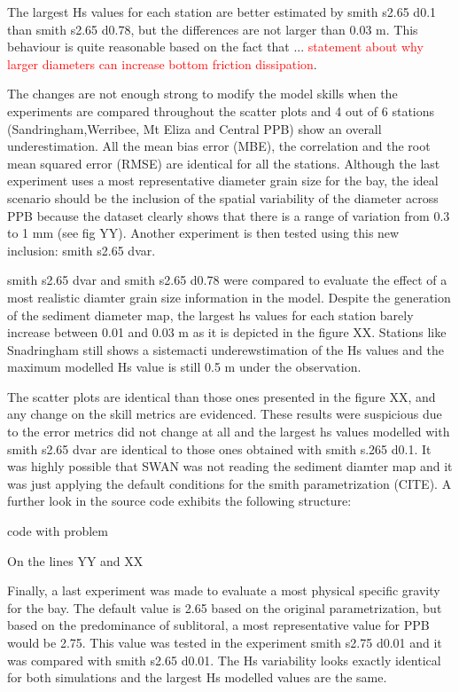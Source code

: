 \documentclass[12pt]{article}
\begin{document}
The largest Hs values for each station are better estimated by smith s2.65 d0.1 than smith s2.65 d0.78, but the differences are not larger than 0.03 m. This behaviour is quite reasonable based on the fact that ... \textcolor{red}{statement about why larger diameters can increase bottom friction dissipation}.

The changes are not enough strong to modify the model skills when the experiments are compared throughout the scatter plots and 4 out of 6 stations (Sandringham,Werribee, Mt Eliza and Central PPB) show an overall underestimation. All the mean bias error (MBE), the correlation and the root mean squared error (RMSE) are identical for all the stations. Although the last experiment uses a most representative diameter grain size for the bay, the ideal scenario should be the inclusion of the spatial variability of the diameter across PPB because the dataset clearly shows that there is a range of variation from 0.3 to 1 mm (see fig YY). Another experiment is then tested using this new inclusion: smith s2.65 dvar.

smith s2.65 dvar and smith s2.65 d0.78 were compared to evaluate the effect of a most realistic diamter grain size information in the model. Despite the generation of the sediment diameter map, the largest hs values for each station barely increase between 0.01 and 0.03 m as it is depicted in the figure XX. Stations like Snadringham still shows a sistemacti underewstimation of the Hs values and the maximum modelled Hs value is still 0.5 m under the observation. 

The scatter plots are identical than those ones presented in the figure XX, and any change on the skill metrics are evidenced. These results were suspicious due to the error metrics did not change at all and the largest hs values modelled with smith s2.65 dvar are identical to those ones obtained with smith s.265 d0.1. It was highly possible that SWAN was not reading the sediment diamter map and it was just applying the default conditions for the smith parametrization (CITE). A further look in the source code exhibits the following structure:

code with problem


On the lines YY and XX 



Finally, a last experiment was made to evaluate a most physical specific gravity for the bay. The default value is 2.65 based on the original parametrization, but based on the predominance of sublitoral, a most representative value for PPB would be 2.75. This value was tested in the experiment smith s2.75 d0.01 and it was compared with smith s2.65 d0.01. The Hs variability looks exactly identical for both simulations and the largest Hs modelled values are the same. 
\end{document}
